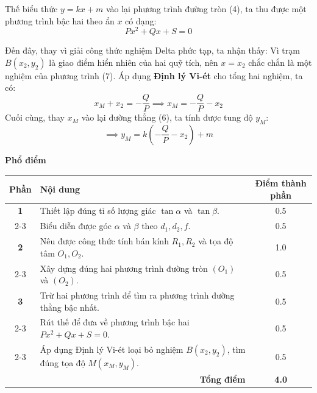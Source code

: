 

Thế biểu thức $y = kx + m$ vào lại phương trình đường tròn (4), ta thu được một phương trình bậc hai theo ẩn $x$ có dạng:
\begin{equation}
    Px^2 + Qx + S = 0
\end{equation}

Đến đây, thay vì giải công thức nghiệm Delta phức tạp, ta nhận thấy: Vì trạm $B(x_2, y_2)$ là giao điểm hiển nhiên của hai quỹ tích, nên $x = x_2$ chắc chắn là một nghiệm của phương trình (7).
Áp dụng \textbf{Định lý Vi-ét} cho tổng hai nghiệm, ta có:
\begin{equation}
    x_M + x_2 = -\frac{Q}{P} \implies x_M = -\frac{Q}{P} - x_2
\end{equation}
Cuối cùng, thay $x_M$ vào lại đường thẳng (6), ta tính được tung độ $y_M$:
\begin{equation}
\implies y_M = k \left(-\frac{Q}{P} - x_2\right) + m 
\end{equation}

\vspace{0.5cm}

\noindent \textbf{\large Phổ điểm}
\begin{center}
\renewcommand{\arraystretch}{1.5}
\begin{tabularx}{\textwidth}{|c|X|c|}
\hline
\textbf{Phần} & \textbf{Nội dung} & \textbf{Điểm thành phần} \\ \hline
\textbf{1} & Thiết lập đúng tỉ số lượng giác $\tan \alpha$ và $\tan \beta$. & 0.5 \\ \cline{2-3} 
 & Biểu diễn được góc $\alpha$ và $\beta$ theo $d_1, d_2, f$. & 0.5 \\ \hline
\textbf{2} & Nêu được công thức tính bán kính $R_1, R_2$ và tọa độ tâm $O_1, O_2$. & 1.0 \\ \cline{2-3} 
 & Xây dựng đúng hai phương trình đường tròn $(O_1)$ và $(O_2)$. & 0.5 \\ \hline
\textbf{3} & Trừ hai phương trình để tìm ra phương trình đường thẳng bậc nhất. & 0.5 \\ \cline{2-3} 
 & Rút thế để đưa về phương trình bậc hai $Px^2 + Qx + S = 0$. & 0.5 \\ \cline{2-3} 
 & Áp dụng Định lý Vi-ét loại bỏ nghiệm $B(x_2, y_2)$, tìm đúng tọa độ $M(x_M, y_M)$. & 0.5 \\ \hline
\multicolumn{2}{|r|}{\textbf{Tổng điểm}} & \textbf{4.0} \\ \hline
\end{tabularx}
\end{center}